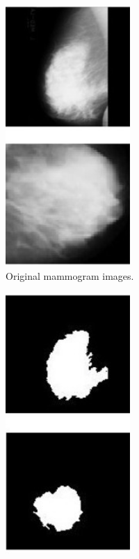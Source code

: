 \begin{figure}[h]
\centering
\begin{subfigure}{.5\textwidth}
  \centering
  \includegraphics[width=0.52\textwidth]{figures/litsurvey/segmentation_example_original.jpg}
  \caption{Original mammogram images.}
  \label{fig:original-mammogram}
\end{subfigure}%
\begin{subfigure}{.5\textwidth}
  \centering
  \includegraphics[width=0.52\textwidth]{figures/litsurvey/segmentation_example_segmented.jpg}

\end{subfigure}
\end{figure}
